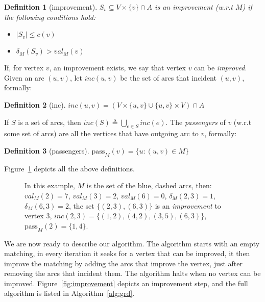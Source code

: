 \documentclass[draft]{article}
\newtheorem{definition}{Definition}
\begin{document}
\begin{definition}[improvement]
$S_v \subseteq V \times \{v\} \cap A$ is an \emph{improvement} (w.r.t $M$)
if the following conditions hold:
\begin{itemize}
\item
$|S_v| \leq c(v)$
\item
$\delta_M(S_v) > val_M(v)$
\end{itemize}  
\end{definition}
%
If, for vertex $v$, an improvement exists, we say that vertex $v$ can be \emph{improved}.
%
Given an arc $(u,v)$, 
let $inc(u,v)$ be the set of arcs that incident $(u, v)$,
formally:
%
\begin{definition}[inc]
$inc(u,v) = (V \times \{u, v\} \cup \{u, v\} \times V) \cap A$
\end{definition}
%
If $S$ is a set of arcs, then $inc(S) \triangleq \bigcup_{e \in S} inc(e)$.
%
The \emph{passengers} of $v$ (w.r.t some set of arcs) are all the vertices that have
outgoing arc to $v$, formally: 
%
\begin{definition}[passengers]
$\text{pass}_M(v) = \{u : (u, v) \in M\}$
\end{definition}
%
Figure~\ref{fig:defs} depicts all the above definitions.

\begin{figure}
\centering
{}
\caption[]{
\label{fig:defs}
In this example, $M$ is the set of the blue, dashed arcs, then:
$val_M(2) = 7$,
$val_M(3) = 2$,
$val_M(6) = 0$,
$\delta_M(2, 3) = 1$,
$\delta_M(6, 3) = 2$,
the set $\{(2,3), (6,3)\}$ is an \emph{improvement} to vertex 3,
$inc(2,3) = \{(1,2),(4,2),(3,5),(6,3)\}$,
$\text{pass}_M(2) = \{1, 4\}$.
}
\end{figure}

We are now ready to describe our algorithm.
The algorithm starts with an empty matching,
in every iteration it seeks for a vertex that can be improved,
it then improve the matching by adding
the arcs that improve the vertex, 
just after removing the arcs that incident them.
The algorithm halts when no vertex can be improved.
Figure~\ref{fig:improvement} depicts an improvement step,
and the full algorithm is listed in Algorithm~\ref{alg:grd}. 
\end{document}
